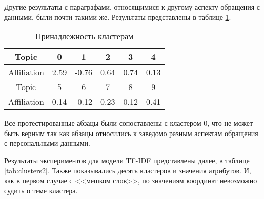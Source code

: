 \documentclass[../main]{subfiles}
\begin{document}
Другие результаты с параграфами, относящимися к другому аспекту обращения с данными, были почти такими же. Результаты
представлены в таблице \ref{tab:affiliation_bow2}.

\begin{longtable}[H]{|c|c|c|c|c|c|}
    \caption{Принадлежность кластерам\label{tab:affiliation_bow2}}\\\hline
    \endfirsthead
    \endhead
    \endfoot
    \endlastfoot
    Topic       & 0    & 1     & 2    & 3    & 4    \\\hline
    Affiliation & 2.59 & -0.76 & 0.64 & 0.74 & 0.13 \\\hline
    Topic       & 5    & 6     & 7    & 8    & 9    \\\hline
    Affiliation & 0.14 & -0.12 & 0.23 & 0.12 & 0.41 \\\hline
\end{longtable}

Все протестированные абзацы были сопоставлены с кластером 0, что не может быть верным так как абзацы относились к заведомо разным аспектам обращения с персональными данными. 

Результаты экспериментов для модели TF-IDF представлены далее, в таблице \ref{tab:clusters2}. Также показывались десять кластеров и значения атрибутов. И, как в первом случае с <<мешком слов>>, по значениям координат невозможно судить о теме кластера.
\end{document}
